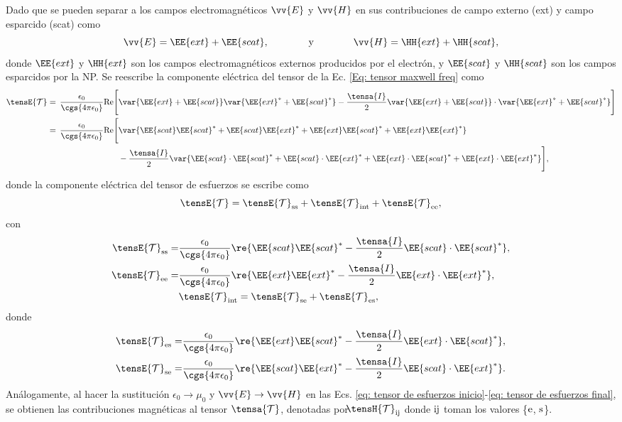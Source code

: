 Dado que se pueden separar a los campos electromagnéticos $\vv{E}$ y $\vv{H}$ en sus contribuciones de campo externo (ext) y campo esparcido (scat) como 
\begin{equation}
\vv{E} = \EE{ext} + \EE{scat}, \qquad\qquad \text{y} \qquad\qquad \vv{H} = \HH{ext} + \HH{scat},
\end{equation}
donde $\EE{ext}$ y $\HH{ext}$ son los campos electromagnéticos externos \textemdash producidos por el electrón\textemdash, y $\EE{scat}$ y $\HH{scat}$ son los campos esparcidos por la NP. Se reescribe la componente eléctrica del tensor de la Ec. \eqref{Eq: tensor maxwell freq} como
\begin{align}
\tensE{\mathcal{T}}=\,\frac{\epsilon_0}{\cgs{4\pi\epsilon_0}} {\rm Re} \Bigg[& \var{\EE{ext}+\EE{scat}}\var{\EE{ext}^{*}+\EE{scat}^{*}}-\frac{\tensa{I}}{2}\var{\EE{ext}+\EE{scat}}\cdot\var{\EE{ext}^{*}+\EE{scat}^{*}} \Bigg] \nonumber \\
= \, \frac{\epsilon_0}{\cgs{4\pi\epsilon_0}} {\rm Re} \Bigg[& \var{\EE{scat}\EE{scat}^{*}+\EE{scat}\EE{ext}^{*}+\EE{ext}\EE{scat}^{*}+\EE{ext}\EE{ext}^{*}}\nonumber \\
&-\frac{\tensa{I}}{2}\var{\EE{scat}\cdot\EE{scat}^{*}+\EE{scat}\cdot\EE{ext}^{*}+\EE{ext}\cdot\EE{scat}^{*}+\EE{ext}\cdot\EE{ext}^{*}} \Bigg],
\label{eq: tensor de esfuerzos inicio}
\end{align}
donde la componente eléctrica del tensor de esfuerzos se escribe como
\begin{equation}
\tensE{\mathcal{T}}=\tensE{\mathcal{T}}_{\rm ss}+\tensE{\mathcal{T}}_{\rm int}+\tensE{\mathcal{T}}_{\rm ee},
\end{equation}
con
\begin{align}
\tensE{\mathcal{T}}_{\rm ss} =& \frac{\epsilon_0}{\cgs{4\pi\epsilon_0}} \re{\EE{scat}\EE{scat}^{*}-\frac{\tensa{I}}{2}\EE{scat}\cdot\EE{scat}^{*}},\label{Eq: tensor de esfuerzos inicio 2}\\
\tensE{\mathcal{T}}_{\rm ee} =& \frac{\epsilon_0}{\cgs{4\pi\epsilon_0}} \re{\EE{ext}\EE{ext}^{*}-\frac{\tensa{I}}{2}\EE{ext}\cdot\EE{ext}^{*}}, \label{Eq: Tee}\\
&\tensE{\mathcal{T}}_{\rm int} = \tensE{\mathcal{T}}_{\rm se} + \tensE{\mathcal{T}}_{\rm es},
\end{align}
donde
\begin{align}
\tensE{\mathcal{T}}_{\rm es} =& \frac{\epsilon_0}{\cgs{4\pi\epsilon_0}} \re{\EE{ext}\EE{scat}^{*}-\frac{\tensa{I}}{2}\EE{ext}\cdot\EE{scat}^{*}},\label{Eq: Tes}\\
\tensE{\mathcal{T}}_{\rm se} =& \frac{\epsilon_0}{\cgs{4\pi\epsilon_0}} \re{\EE{scat}\EE{ext}^{*}-\frac{\tensa{I}}{2}\EE{scat}\cdot\EE{ext}^{*}}.
\label{eq: tensor de esfuerzos final}
\end{align}
Análogamente, al hacer la sustitución $\epsilon_0 \to \mu_0$ y $\vv{E}\to\vv{H}$ en las Ecs. \eqref{eq: tensor de esfuerzos inicio}-\eqref{eq: tensor de esfuerzos final}, se obtienen las contribuciones magnéticas al tensor $\tensa{\mathcal{T}}$, denotadas por $\hspace{-0.6 em}\tensH{\mathcal{T}}_{\rm ij}$ donde $\rm ij$ toman los valores \{$\rm e$, $\rm s$\}.


